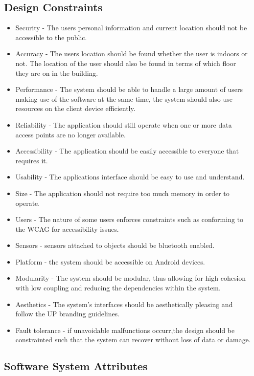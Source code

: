 \documentclass{article}
\begin{document}
	\subsection{Design Constraints}
		\begin{itemize}
				\item Security  - The users personal information and current location should not be accessible to the public.
				\item Accuracy - The users location should be found whether the user is indoors or not. The location of the user should also be found in terms of which floor they are on in the building.
				\item Performance - The system should be able to handle a large amount of users making use of the software at the same time, the system should also use resources on the client device efficiently.
				\item Reliability - The application should still operate when one or more data access points are no longer available.
				\item Accessibility - The application should be easily accessible to everyone that requires it.
				\item Usability - The applications interface should be easy to use and understand.
				\item Size - The application should not require too much memory in order to operate.
				\item Users - The nature of some users enforces constraints such as conforming to the WCAG for accessibility issues.
				\item Sensors - sensors attached to objects should be bluetooth enabled.
				\item Platform - the system should be accessible on  Android  devices.
				\item Modularity - The system should be modular, thus allowing for high cohesion with low coupling and reducing the dependencies within the system.
				\item Aesthetics - The system's interfaces should be aesthetically pleasing and follow the UP branding guidelines.
				\item Fault tolerance - if unavoidable malfunctions occurr,the design should be constrainted such that the system can recover without loss of data or damage.
				
			\end{itemize}
	
	\subsection{Software System Attributes}
\end{document}
